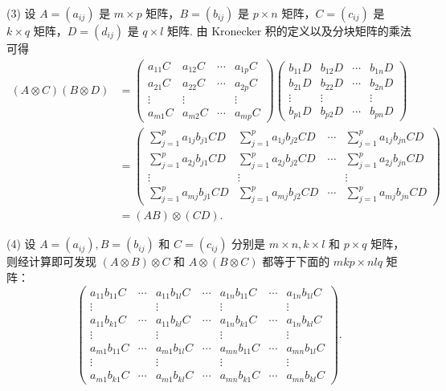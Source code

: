 \documentclass[UTF8, 12pt, fontset=fandol, oneside]{ctexart}
\begin{document}
(3) 设 $A=(a_{ij})$ 是 $m\times p$ 矩阵，$B=(b_{ij})$ 是 $p\times n$ 矩阵，$C=(c_{ij})$ 是 $k\times q$ 矩阵，$D=(d_{ij})$ 是 $q\times l$ 矩阵. 由 Kronecker 积的定义以及分块矩阵的乘法可得
\[
\begin{aligned}
(A\otimes C)(B\otimes D)
&=
\begin{pmatrix}
a_{11}C&a_{12}C&\cdots&a_{1p}C\\
a_{21}C&a_{22}C&\cdots&a_{2p}C\\
\vdots&\vdots&&\vdots\\
a_{m1}C&a_{m2}C&\cdots&a_{mp}C
\end{pmatrix}
\begin{pmatrix}
b_{11}D&b_{12}D&\cdots&b_{1n}D\\
b_{21}D&b_{22}D&\cdots&b_{2n}D\\
\vdots&\vdots&&\vdots\\
b_{p1}D&b_{p2}D&\cdots&b_{pn}D
\end{pmatrix}  \\
&=
\begin{pmatrix}
\sum_{j=1}^p a_{1j}b_{j1}CD&\sum_{j=1}^p a_{1j}b_{j2}CD&\cdots&\sum_{j=1}^p a_{1j}b_{jn}CD\\
\sum_{j=1}^p a_{2j}b_{j1}CD&\sum_{j=1}^p a_{2j}b_{j2}CD&\cdots&\sum_{j=1}^p a_{2j}b_{jn}CD\\
\vdots&\vdots&&\vdots\\
\sum_{j=1}^p a_{mj}b_{j1}CD&\sum_{j=1}^p a_{mj}b_{j2}CD&\cdots&\sum_{j=1}^p a_{mj}b_{jn}CD
\end{pmatrix}  \\
&=(AB)\otimes(CD).
\end{aligned}
\]

(4) 设 $A=(a_{ij}),B=(b_{ij})$ 和 $C=(c_{ij})$ 分别是 $m\times n,k\times l$ 和 $p\times q$ 矩阵，则经计算即可发现 $(A\otimes B)\otimes C$ 和 $A\otimes(B\otimes C)$ 都等于下面的 $mkp\times nlq$ 矩阵：
\[
\begin{pmatrix}
a_{11}b_{11}C&\cdots&a_{11}b_{1l}C&\cdots&a_{1n}b_{11}C&\cdots&a_{1n}b_{1l}C\\
\vdots&&\vdots&&\vdots&&\vdots\\
a_{11}b_{k1}C&\cdots&a_{11}b_{kl}C&\cdots&a_{1n}b_{k1}C&\cdots&a_{1n}b_{kl}C\\
\vdots&&\vdots&&\vdots&&\vdots\\
a_{m1}b_{11}C&\cdots&a_{m1}b_{1l}C&\cdots&a_{mn}b_{11}C&\cdots&a_{mn}b_{1l}C\\
\vdots&&\vdots&&\vdots&&\vdots\\
a_{m1}b_{k1}C&\cdots&a_{m1}b_{kl}C&\cdots&a_{mn}b_{k1}C&\cdots&a_{mn}b_{kl}C
\end{pmatrix}.
\]
\end{document}

